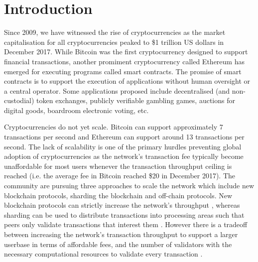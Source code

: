 \documentclass{llncs}
\begin{document}
\section{Introduction}

Since 2009, we have witnessed the rise of cryptocurrencies as the market capitalisation for all cryptocurrencies peaked to \$1 trillion US dollars in December 2017.
While Bitcoin was the first cryptocurrency designed to support financial transactions, another promiment cryptocurrency called Ethereum has emerged for executing programs called smart contracts. 
The promise of smart contracts is to support the execution of applications without human oversight or a central operator. 
Some applications proposed include decentralised (and non-custodial) token exchanges, publicly verifiable gambling games, auctions for digital goods, boardroom electronic voting, etc. 

Cryptocurrencies do not yet scale. 
Bitcoin can support approximately 7 transactions per second and Ethereum can support around 13 transactions per second. 
The lack of scalability is one of the primary hurdles preventing global adoption of cryptocurrencies as the network's transaction fee typically become unaffordable  for most users whenever the transaction throughput ceiling is reached (i.e. the average fee in Bitcoin reached \$20 in December 2017).
The community are pursuing three approaches to scale the network which include new blockchain protocols, sharding the blockchain and off-chain protocols. 
New blockchain protocols can strictly increase the network's throughput \cite{sompolinsky2016spectre,eyal2016bitcoin,sompolinsky2015secure}, whereas sharding can be used to distribute transactions into processing areas such that peers only validate transactions that interest them \cite{kokoris2018omniledger,al2017chainspace,luu2016secure}. 
However there is a tradeoff between increasing the network's transaction throughput to support a larger userbase in terms of affordable fees, and the number of validators with the necessary computational resources to validate every transaction \cite{mccorry2017atomically,gervais2016security,croman2016scaling}.
\end{document}
